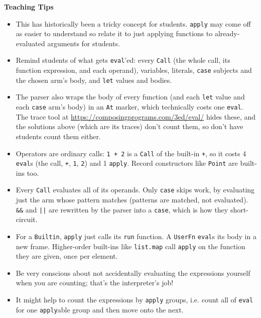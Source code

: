 \begin{guide}
\textbf{Teaching Tips}
\begin{itemize}
	\item This has historically been a tricky concept for students. \lstinline$apply$ may come off as easier to understand so relate it to just applying functions to already-evaluated arguments for students.
	\item Remind students of what gets \lstinline$eval$'ed: every \lstinline{Call} (the whole call, its function expression, and each operand), variables, literals, \lstinline{case} subjects and the chosen arm's body, and \lstinline{let} values and bodies.
	\item The parser also wraps the body of every function (and each \lstinline{let} value and each \lstinline{case} arm's body) in an \lstinline{At} marker, which technically costs one \lstinline$eval$. The trace tool at \url{https://composingprograms.com/3ed/eval/} hides these, and the solutions above (which are its traces) don't count them, so don't have students count them either.
	\item Operators are ordinary calls: \lstinline{1 + 2} is a \lstinline{Call} of the built-in \lstinline{+}, so it costs 4 \lstinline$eval$s (the call, \lstinline{+}, \lstinline{1}, \lstinline{2}) and 1 \lstinline$apply$. Record constructors like \lstinline{Point} are built-ins too.
	\item Every \lstinline{Call} evaluates all of its operands. Only \lstinline{case} skips work, by evaluating just the arm whose pattern matches (patterns are matched, not evaluated). \lstinline{&&} and \lstinline{||} are rewritten by the parser into a \lstinline{case}, which is how they short-circuit.
	\item For a \lstinline{Builtin}, \lstinline$apply$ just calls its \lstinline{run} function. A \lstinline{UserFn} \lstinline$eval$s its body in a new frame. Higher-order built-ins like \lstinline{list.map} call \lstinline$apply$ on the function they are given, once per element.
	\item Be very conscious about not accidentally evaluating the expressions yourself when you are counting; that's the interpreter's job!
	\item It might help to count the expressions by \lstinline$apply$ groups, i.e. count all of \lstinline$eval$ for one \lstinline$apply$able group and then move onto the next.
\end{itemize}
\end{guide}

